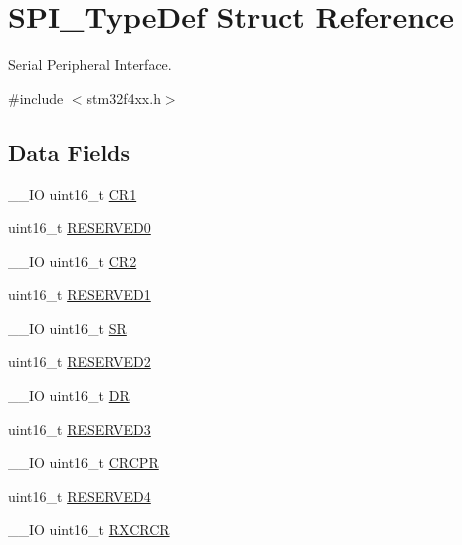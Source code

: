\hypertarget{struct_s_p_i___type_def}{\section{S\-P\-I\-\_\-\-Type\-Def Struct Reference}
\label{struct_s_p_i___type_def}
}


Serial Peripheral Interface.  




{\ttfamily \#include $<$stm32f4xx.\-h$>$}

\subsection*{Data Fields}
\begin{DoxyCompactItemize}
\item 
\-\_\-\-\_\-\-I\-O uint16\-\_\-t \hyperlink{struct_s_p_i___type_def_a61400ce239355b62aa25c95fcc18a5e1}{C\-R1}
\item 
uint16\-\_\-t \hyperlink{struct_s_p_i___type_def_a149feba01f9c4a49570c6d88619f504f}{R\-E\-S\-E\-R\-V\-E\-D0}
\item 
\-\_\-\-\_\-\-I\-O uint16\-\_\-t \hyperlink{struct_s_p_i___type_def_a2a3e81bd118d1bc52d24a0b0772e6a0c}{C\-R2}
\item 
uint16\-\_\-t \hyperlink{struct_s_p_i___type_def_a8249a3955aace28d92109b391311eb30}{R\-E\-S\-E\-R\-V\-E\-D1}
\item 
\-\_\-\-\_\-\-I\-O uint16\-\_\-t \hyperlink{struct_s_p_i___type_def_a44962ea5442d203bf4954035d1bfeb9d}{S\-R}
\item 
uint16\-\_\-t \hyperlink{struct_s_p_i___type_def_a5573848497a716a9947fd87487709feb}{R\-E\-S\-E\-R\-V\-E\-D2}
\item 
\-\_\-\-\_\-\-I\-O uint16\-\_\-t \hyperlink{struct_s_p_i___type_def_a0a1acc0425516ff7969709d118b96a3b}{D\-R}
\item 
uint16\-\_\-t \hyperlink{struct_s_p_i___type_def_a6c3b31022e6f59b800e9f5cc2a89d54c}{R\-E\-S\-E\-R\-V\-E\-D3}
\item 
\-\_\-\-\_\-\-I\-O uint16\-\_\-t \hyperlink{struct_s_p_i___type_def_a942ae09a7662bad70ef336f2bed43a19}{C\-R\-C\-P\-R}
\item 
uint16\-\_\-t \hyperlink{struct_s_p_i___type_def_aa0223808025f5bf9c056185038c9d545}{R\-E\-S\-E\-R\-V\-E\-D4}
\item 
\-\_\-\-\_\-\-I\-O uint16\-\_\-t \hyperlink{struct_s_p_i___type_def_a7ad53aa3735ccdd785e3eec02faf5eb9}{R\-X\-C\-R\-C\-R}
\item 

\end{DoxyCompactItemize}
